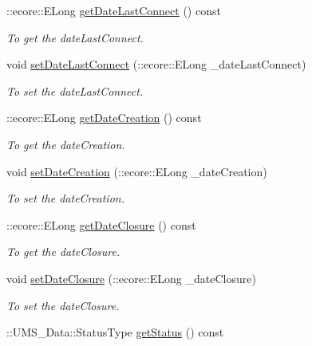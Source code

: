 \begin{DoxyCompactItemize}
::ecore::ELong \hyperlink{classUMS__Data_1_1Session_ac94313c0439ceca8dc6b7b1791eabfc5}{getDateLastConnect} () const 
\begin{DoxyCompactList}\small\item\em To get the dateLastConnect. \item\end{DoxyCompactList}\item 
void \hyperlink{classUMS__Data_1_1Session_a53b9259ece36918b9ea2b0495813c234}{setDateLastConnect} (::ecore::ELong \_\-dateLastConnect)
\begin{DoxyCompactList}\small\item\em To set the dateLastConnect. \item\end{DoxyCompactList}\item 
::ecore::ELong \hyperlink{classUMS__Data_1_1Session_a4b86d3417eeefe07f663722264467b38}{getDateCreation} () const 
\begin{DoxyCompactList}\small\item\em To get the dateCreation. \item\end{DoxyCompactList}\item 
void \hyperlink{classUMS__Data_1_1Session_a83c55ea9340c642df1b55442b1ab6369}{setDateCreation} (::ecore::ELong \_\-dateCreation)
\begin{DoxyCompactList}\small\item\em To set the dateCreation. \item\end{DoxyCompactList}\item 
::ecore::ELong \hyperlink{classUMS__Data_1_1Session_a8333c82c89b64a21d3a78a643d2342c7}{getDateClosure} () const 
\begin{DoxyCompactList}\small\item\em To get the dateClosure. \item\end{DoxyCompactList}\item 
void \hyperlink{classUMS__Data_1_1Session_a9138e37f940247b33555b2ef6facfd82}{setDateClosure} (::ecore::ELong \_\-dateClosure)
\begin{DoxyCompactList}\small\item\em To set the dateClosure. \item\end{DoxyCompactList}\item 
::UMS\_\-Data::StatusType \hyperlink{classUMS__Data_1_1Session_a3083adee63593661c9cc99cf43f8dd0b}{getStatus} () const 

\end{DoxyCompactItemize}
